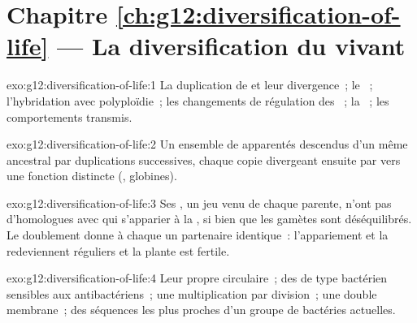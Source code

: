 \section*{Chapitre \ref{ch:g12:diversification-of-life} --- La diversification du vivant}

\begin{solution}{exo:g12:diversification-of-life:1}
La duplication de  et leur divergence~; le ~; l'hybridation avec polyploïdie~; les changements de régulation
des ~; la ~; les comportements transmis.
\end{solution}

\begin{solution}{exo:g12:diversification-of-life:2}
Un ensemble de  apparentés descendus d'un même  ancestral par
duplications successives, chaque copie divergeant ensuite par 
vers une fonction distincte (, globines).
\end{solution}

\begin{solution}{exo:g12:diversification-of-life:3}
Ses , un jeu venu de chaque  parente, n'ont pas
d'homologues avec qui s'apparier à la , si bien que les gamètes
sont déséquilibrés. Le doublement donne à chaque  un
partenaire identique~: l'appariement et la  redeviennent
réguliers et la plante est fertile.
\end{solution}

\begin{solution}{exo:g12:diversification-of-life:4}
Leur propre  circulaire~; des  de type bactérien sensibles
aux  antibactériens~; une multiplication par division~;
une double membrane~; des séquences les plus proches d'un groupe de
bactéries actuelles.
\end{solution}

